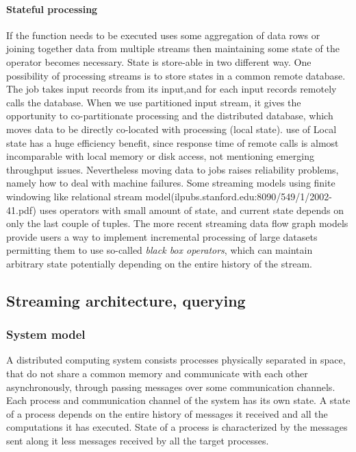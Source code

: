 \paragraph{Stateful processing}
If the function needs to be executed uses some aggregation of data rows or joining together data from multiple streams then maintaining some state of the operator becomes necessary. 
State is store-able in two different way. One possibility of processing streams is to store states in a common remote database. The job takes input records from its input,and for each input records remotely calls the database. 
When we use partitioned input stream, it gives the opportunity to co-partitionate processing and the distributed database, which moves data to be directly co-located with processing (local state).
use of Local state has a huge efficiency benefit, since response time of remote calls is almost incomparable with local memory or disk access, not mentioning emerging throughput issues.
Nevertheless moving data to jobs raises reliability problems, namely  how to deal with machine failures.\cite{localstate}
Some streaming models using finite windowing like relational stream model(ilpubs.stanford.edu:8090/549/1/2002-41.pdf) uses operators with small amount of state, and current state depends on only the last couple of tuples. The more recent streaming data flow graph models provide users a way to implement incremental processing of large datasets permitting them to use so-called \textit{black box operators}, which can maintain arbitrary state potentially depending on the entire history of the stream. \cite{pietzuch:intscaleoutandft}  


\subsection{Streaming architecture, querying }
\subsubsection{System model}
A distributed computing system consists processes physically separated in space, that do not share a common memory and communicate with each other asynchronously, through passing messages over some communication channels. Each process and communication channel of the system has its  own state. A state of a process depends on the entire history of messages it received and all the computations it has executed. State of a process is characterized by the messages sent along it less messages received by all the  target processes.
\cite{introsnapshot}
